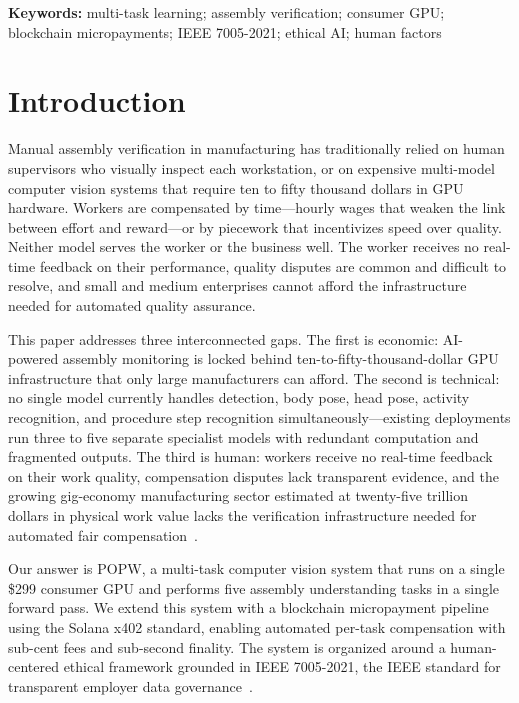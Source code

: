 \documentclass[10pt,twocolumn]{article}
\newcommand{\popw}{POPW}
\begin{document}
\textbf{Keywords:} multi-task learning; assembly verification; consumer GPU; blockchain micropayments; IEEE 7005-2021; ethical AI; human factors

\section{Introduction}
\label{sec:intro}

Manual assembly verification in manufacturing has traditionally relied on human supervisors who visually inspect each workstation, or on expensive multi-model computer vision systems that require ten to fifty thousand dollars in GPU hardware. Workers are compensated by time---hourly wages that weaken the link between effort and reward---or by piecework that incentivizes speed over quality. Neither model serves the worker or the business well. The worker receives no real-time feedback on their performance, quality disputes are common and difficult to resolve, and small and medium enterprises cannot afford the infrastructure needed for automated quality assurance.

This paper addresses three interconnected gaps. The first is economic: AI-powered assembly monitoring is locked behind ten-to-fifty-thousand-dollar GPU infrastructure that only large manufacturers can afford. The second is technical: no single model currently handles detection, body pose, head pose, activity recognition, and procedure step recognition simultaneously---existing deployments run three to five separate specialist models with redundant computation and fragmented outputs. The third is human: workers receive no real-time feedback on their work quality, compensation disputes lack transparent evidence, and the growing gig-economy manufacturing sector estimated at twenty-five trillion dollars in physical work value lacks the verification infrastructure needed for automated fair compensation~\cite{konnex2026popw}.

Our answer is \popw, a multi-task computer vision system that runs on a single \$299 consumer GPU and performs five assembly understanding tasks in a single forward pass. We extend this system with a blockchain micropayment pipeline using the Solana x402 standard, enabling automated per-task compensation with sub-cent fees and sub-second finality. The system is organized around a human-centered ethical framework grounded in IEEE 7005-2021, the IEEE standard for transparent employer data governance~\cite{IEEE7005}.
\end{document}
